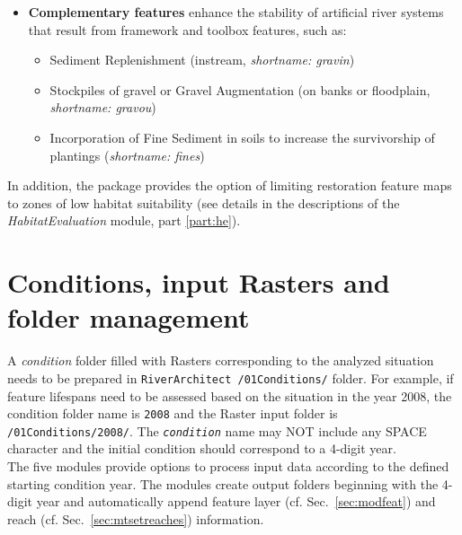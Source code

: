 \begin{itemize}
	\item \textbf{Complementary features} enhance the stability of artificial river systems that result from framework and toolbox features, such as:
	\begin{itemize}
		\item Sediment Replenishment (instream, \textit{shortname: gravin})
		\item Stockpiles of gravel or Gravel Augmentation (on banks or floodplain, \textit{shortname: gravou})
		\item Incorporation of Fine Sediment in soils to increase the survivorship of plantings (\textit{shortname: fines})		
	\end{itemize}
\end{itemize}

In addition, the package provides the option of limiting restoration feature maps to zones of low habitat suitability (see details in the descriptions of the \textit{HabitatEvaluation} module, part \ref{part:he}).

\section{Conditions, input Rasters and folder management} \label{sec:input}

A \textit{condition} folder filled with Rasters corresponding to the analyzed situation needs to be prepared in \texttt{RiverArchitect /01{\myUnderscore}Conditions/} folder. For example, if feature lifespans need to be assessed based on the situation in the year 2008, the condition folder name is \texttt{2008} and the Raster input folder is \texttt{/01{\myUnderscore}Conditions/2008/}. The \texttt{\textit{condition}} name may NOT include any SPACE character and the initial condition should correspond to a 4-digit year.\\
The five modules provide options to process input data according to the defined starting condition year. The modules create output folders beginning with the 4-digit year and automatically append feature layer (cf. Sec.~\ref{sec:modfeat}) and reach (cf. Sec.~\ref{sec:mtsetreaches}) information.\\

